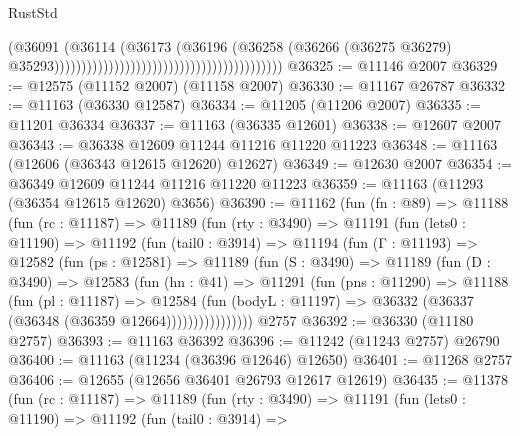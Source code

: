 \begin{lexlean}{RustStd}
\begin{coremodule}
                                                                            (@36091
                                                                              (@36114
                                                                                (@36173
                                                                                  (@36196
                                                                                    (@36258
                                                                                      (@36266
                                                                                        (@36275
                                                                                          @36279)
                                                                                        @35293))))))))))))))))))))))))))))))))))))))))))
@36325 := @11146 @2007
@36329 := @12575 (@11152 @2007) (@11158 @2007)
@36330 := @11167 @26787
@36332 := @11163 (@36330 @12587)
@36334 := @11205 (@11206 @2007)
@36335 := @11201 @36334
@36337 := @11163 (@36335 @12601)
@36338 := @12607 @2007
@36343 := @36338 @12609 @11244 @11216 @11220 @11223
@36348 := @11163 (@12606 (@36343 @12615 @12620) @12627)
@36349 := @12630 @2007
@36354 := @36349 @12609 @11244 @11216 @11220 @11223
@36359 := @11163 (@11293 (@36354 @12615 @12620) @3656)
@36390 := @11162
    (fun (fn : @89) =>
    @11188
      (fun (rc : @11187) =>
      @11189
        (fun (rty : @3490) =>
        @11191
          (fun (lets0 : @11190) =>
          @11192
            (fun (tail0 : @3914) =>
            @11194
              (fun (Γ : @11193) =>
              @12582
                (fun (ps : @12581) =>
                @11189
                  (fun (S : @3490) =>
                  @11189
                    (fun (D : @3490) =>
                    @12583
                      (fun (hn : @41) =>
                      @11291
                        (fun (pns : @11290) =>
                        @11188
                          (fun (pl : @11187) =>
                          @12584
                            (fun (bodyL : @11197) =>
                            @36332 (@36337 (@36348 (@36359 @12664))))))))))))))))
    @2757
@36392 := @36330 (@11180 @2757)
@36393 := @11163 @36392
@36396 := @11242 (@11243 @2757) @26790
@36400 := @11163 (@11234 (@36396 @12646) @12650)
@36401 := @11268 @2757
@36406 := @12655 (@12656 @36401 @26793 @12617 @12619)
@36435 := @11378
    (fun (rc : @11187) =>
    @11189
      (fun (rty : @3490) =>
      @11191
        (fun (lets0 : @11190) =>
        @11192
          (fun (tail0 : @3914) =>

\end{coremodule}
\end{lexlean}
